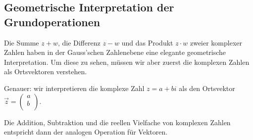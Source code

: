 











































\clearpage
\subsection{Geometrische Interpretation der Grundoperationen}
Die Summe $z+w$, die Differenz $z-w$ und das Produkt $z\cdot w$ zweier komplexer Zahlen haben in der Gauss'schen Zahlenebene eine elegante geometrische Interpretation. Um diese zu sehen, müssen wir aber zuerst die komplexen Zahlen als Ortsvektoren verstehen.

Genauer: wir interpretieren die komplexe Zahl $z=a+bi$ als den Ortsvektor $\vec{z}=\left(\begin{array}{c}a\\b\\ \end{array}\right)$.

Die Addition, Subtraktion und die reellen Vielfache von komplexen Zahlen entspricht dann der analogen Operation für Vektoren.

